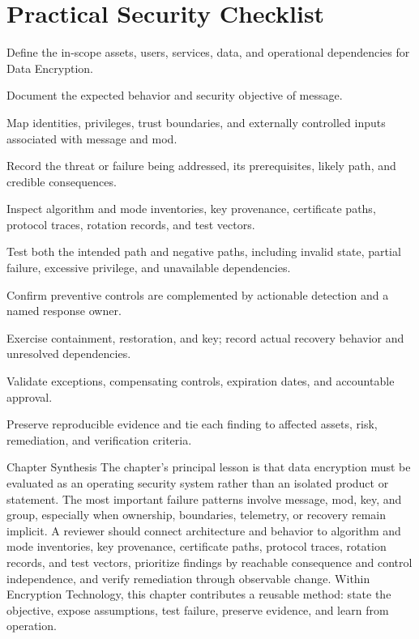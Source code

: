 \documentclass[11pt,letterpaper]{article}
\begin{document}
\section*{Practical Security Checklist}
\begin{CornellChecklist}
\item Define the in-scope assets, users, services, data, and operational dependencies for Data Encryption.
\item Document the expected behavior and security objective of message.
\item Map identities, privileges, trust boundaries, and externally controlled inputs associated with message and mod.
\item Record the threat or failure being addressed, its prerequisites, likely path, and credible consequences.
\item Inspect algorithm and mode inventories, key provenance, certificate paths, protocol traces, rotation records, and test vectors.
\item Test both the intended path and negative paths, including invalid state, partial failure, excessive privilege, and unavailable dependencies.
\item Confirm preventive controls are complemented by actionable detection and a named response owner.
\item Exercise containment, restoration, and key; record actual recovery behavior and unresolved dependencies.
\item Validate exceptions, compensating controls, expiration dates, and accountable approval.
\item Preserve reproducible evidence and tie each finding to affected assets, risk, remediation, and verification criteria.
\end{CornellChecklist}
\begin{CornellSummaryBox}{Chapter Synthesis}
The chapter's principal lesson is that data encryption must be evaluated as an operating security system rather than an isolated product or statement. The most important failure patterns involve message, mod, key, and group, especially when ownership, boundaries, telemetry, or recovery remain implicit. A reviewer should connect architecture and behavior to algorithm and mode inventories, key provenance, certificate paths, protocol traces, rotation records, and test vectors, prioritize findings by reachable consequence and control independence, and verify remediation through observable change. Within Encryption Technology, this chapter contributes a reusable method: state the objective, expose assumptions, test failure, preserve evidence, and learn from operation.
\end{CornellSummaryBox}
\end{document}
